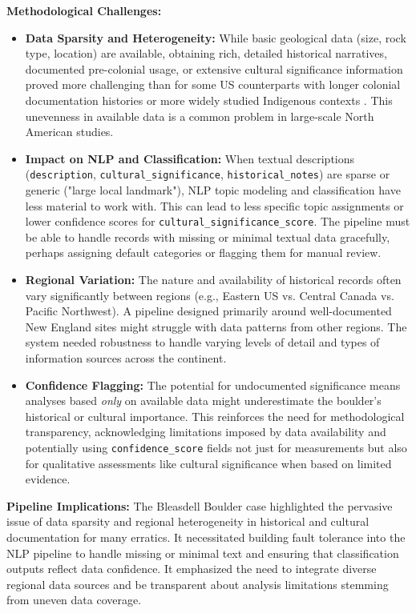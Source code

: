 \textbf{Methodological Challenges:}
\begin{itemize}
    \item \textbf{Data Sparsity and Heterogeneity:} While basic geological data (size, rock type, location) are available, obtaining rich, detailed historical narratives, documented pre-colonial usage, or extensive cultural significance information proved more challenging than for some US counterparts with longer colonial documentation histories or more widely studied Indigenous contexts \cite{Delcourt1991}. This unevenness in available data is a common problem in large-scale North American studies.
    \item \textbf{Impact on NLP and Classification:} When textual descriptions (\texttt{description}, \texttt{cultural\_significance}, \texttt{historical\_notes}) are sparse or generic ("large local landmark"), NLP topic modeling and classification have less material to work with. This can lead to less specific topic assignments or lower confidence scores for \texttt{cultural\_significance\_score}. The pipeline must be able to handle records with missing or minimal textual data gracefully, perhaps assigning default categories or flagging them for manual review.
    \item \textbf{Regional Variation:} The nature and availability of historical records often vary significantly between regions (e.g., Eastern US vs. Central Canada vs. Pacific Northwest). A pipeline designed primarily around well-documented New England sites might struggle with data patterns from other regions. The system needed robustness to handle varying levels of detail and types of information sources across the continent.
    \item \textbf{Confidence Flagging:} The potential for undocumented significance means analyses based \emph{only} on available data might underestimate the boulder's historical or cultural importance. This reinforces the need for methodological transparency, acknowledging limitations imposed by data availability and potentially using \texttt{confidence\_score} fields not just for measurements but also for qualitative assessments like cultural significance when based on limited evidence.
\end{itemize}

\textbf{Pipeline Implications:} The Bleasdell Boulder case highlighted the pervasive issue of data sparsity and regional heterogeneity in historical and cultural documentation for many erratics. It necessitated building fault tolerance into the NLP pipeline to handle missing or minimal text and ensuring that classification outputs reflect data confidence. It emphasized the need to integrate diverse regional data sources and be transparent about analysis limitations stemming from uneven data coverage.

